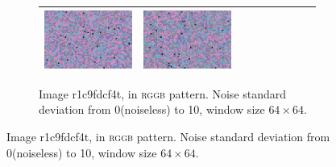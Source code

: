 \documentclass{ipol}
\begin{document}
\begin{figure}[ht]
\begin{subfigure}[t]{\linewidth}
\begin{tabular}{ccccccccc}
                \includegraphics[width=\s]{images/tower/PPG/bid_n10_64_grids.png}&
                \includegraphics[width=\s]{images/tower/VNG/bid_n10_64_grids.png}\\
                \bottomrule
        \end{tabular}
        \caption{Image r1c9fdcf4t, in \textsc{rggb} pattern. Noise standard deviation from 0(noiseless) to 10, window size $64\times64$.}
        \label{fig:noise:2}
\end{subfigure}
\end{figure}
\end{document}
